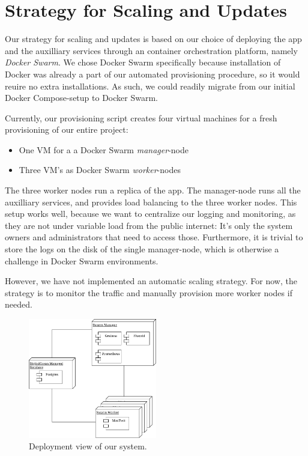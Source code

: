 \section{Strategy for Scaling and Updates}

Our strategy for scaling and updates is based on our choice of deploying the app and the auxilliary services through an container orchestration platform, namely \textit{Docker Swarm}. We chose Docker Swarm specifically because installation of Docker was already a part of our automated provisioning procedure, so it would reuire no extra installations.
As such, we could readily migrate from our initial Docker Compose-setup to Docker Swarm.

Currently, our provisioning script creates four virtual machines for a fresh provisioning of our entire project:

\begin{itemize}
	\item One VM for a a Docker Swarm \textit{manager}-node
	\item Three VM's as Docker Swarm \textit{worker}-nodes
\end{itemize}

The three worker nodes run a replica of the app.
The manager-node runs all the auxilliary services, and provides load balancing to the three worker nodes.
This setup works well, because we want to centralize our logging and monitoring, as they are not under variable load from the public internet: It's only the system owners and administrators that need to access those.
Furthermore, it is trivial to store the logs on the disk of the single manager-node, which is otherwise a challenge in Docker Swarm environments.

However, we have not implemented an automatic scaling strategy. For now, the strategy is to monitor the traffic and manually provision more worker nodes if needed.

\begin{figure}
	\begin{center}
		\includegraphics[width=0.50\textwidth]{img/deployment.pdf}
	\end{center}
	\caption{Deployment view of our system.}\label{fig:deployment}
\end{figure}

